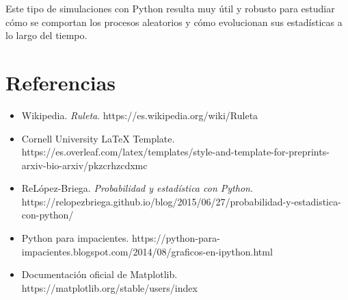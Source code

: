 \documentclass{article}
\begin{document}
Este tipo de simulaciones con Python resulta muy útil y robusto para estudiar cómo se comportan los procesos aleatorios y cómo evolucionan sus estadísticas a lo largo del tiempo.

\section{Referencias}
\begin{itemize}
  \item Wikipedia. \textit{Ruleta}. https://es.wikipedia.org/wiki/Ruleta
  \item Cornell University LaTeX Template. https://es.overleaf.com/latex/templates/style-and-template-for-preprints-arxiv-bio-arxiv/pkzcrhzcdxmc
  \item ReLópez-Briega. \textit{Probabilidad y estadística con Python}. https://relopezbriega.github.io/blog/2015/06/27/probabilidad-y-estadistica-con-python/
  \item Python para impacientes. https://python-para-impacientes.blogspot.com/2014/08/graficos-en-ipython.html
  \item Documentación oficial de Matplotlib. https://matplotlib.org/stable/users/index
\end{itemize}
\end{document}
